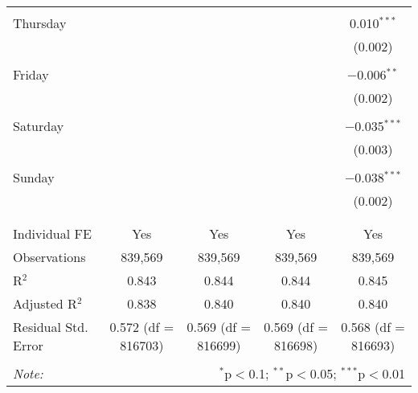 \documentclass[
]{article}
\begin{document}
\begin{table}[!htbp]
{\begin{tabular}{@{\extracolsep{5pt}}lcccc}
  & & & & \\ 
 Thursday &  &  &  & 0.010$^{***}$ \\ 
  &  &  &  & (0.002) \\ 
  & & & & \\ 
 Friday &  &  &  & $-$0.006$^{**}$ \\ 
  &  &  &  & (0.002) \\ 
  & & & & \\ 
 Saturday &  &  &  & $-$0.035$^{***}$ \\ 
  &  &  &  & (0.003) \\ 
  & & & & \\ 
 Sunday &  &  &  & $-$0.038$^{***}$ \\ 
  &  &  &  & (0.002) \\ 
  & & & & \\ 
\hline \\[-1.8ex] 
Individual FE & Yes & Yes & Yes & Yes \\ 
Observations & 839,569 & 839,569 & 839,569 & 839,569 \\ 
R$^{2}$ & 0.843 & 0.844 & 0.844 & 0.845 \\ 
Adjusted R$^{2}$ & 0.838 & 0.840 & 0.840 & 0.840 \\ 
Residual Std. Error & 0.572 (df = 816703) & 0.569 (df = 816699) & 0.569 (df = 816698) & 0.568 (df = 816693) \\ 
\hline 
\hline \\[-1.8ex] 
\textit{Note:}  & \multicolumn{4}{r}{$^{*}$p$<$0.1; $^{**}$p$<$0.05; $^{***}$p$<$0.01} \\ 
\end{tabular}
} 
\end{table} 
\newpage
\end{document}
